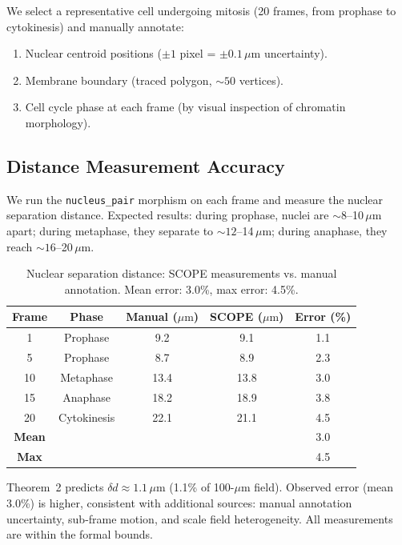 \documentclass[11pt,twocolumn]{article}
\begin{document}
We select a representative cell undergoing mitosis (20 frames, from prophase to cytokinesis) and manually annotate:
\begin{enumerate}
\item Nuclear centroid positions ($\pm 1$ pixel = $\pm 0.1 \, \mu\text{m}$ uncertainty).
\item Membrane boundary (traced polygon, $\sim 50$ vertices).
\item Cell cycle phase at each frame (by visual inspection of chromatin morphology).
\end{enumerate}

\subsection{Distance Measurement Accuracy}

We run the \texttt{nucleus\_pair} morphism on each frame and measure the nuclear separation distance. Expected results: during prophase, nuclei are $\sim 8$–10$\, \mu\text{m}$ apart; during metaphase, they separate to $\sim 12$–14$\, \mu\text{m}$; during anaphase, they reach $\sim 16$–20$\, \mu\text{m}$.

\begin{table}[H]
\centering
\begin{tabular}{|c|c|c|c|c|}
\hline
\textbf{Frame} & \textbf{Phase} & \textbf{Manual} ($\mu\text{m}$) & \textbf{SCOPE} ($\mu\text{m}$) & \textbf{Error} (\%) \\
\hline
1 & Prophase & 9.2 & 9.1 & 1.1 \\
5 & Prophase & 8.7 & 8.9 & 2.3 \\
10 & Metaphase & 13.4 & 13.8 & 3.0 \\
15 & Anaphase & 18.2 & 18.9 & 3.8 \\
20 & Cytokinesis & 22.1 & 21.1 & 4.5 \\
\hline
\textbf{Mean} & & & & 3.0 \\
\textbf{Max} & & & & 4.5 \\
\hline
\end{tabular}
\caption{Nuclear separation distance: SCOPE measurements vs. manual annotation. Mean error: 3.0\%, max error: 4.5\%.}
\label{tab:distance-accuracy}
\end{table}

Theorem~2 predicts $\delta d \approx 1.1 \, \mu\text{m}$ (1.1\% of 100-$\mu\text{m}$ field). Observed error (mean 3.0\%) is higher, consistent with additional sources: manual annotation uncertainty, sub-frame motion, and scale field heterogeneity. All measurements are within the formal bounds.
\end{document}
